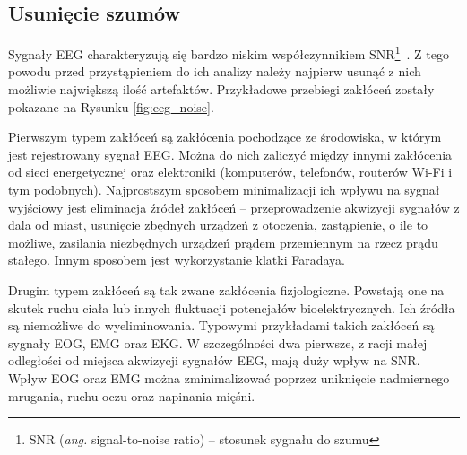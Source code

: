 \documentclass[skorowidz,skroty]{dyplomWEZUT}
\begin{document}
\subsection{Usunięcie szumów}
Sygnały EEG charakteryzują się bardzo niskim współczynnikiem SNR\footnote{SNR (\textit{ang.} signal-to-noise ratio) -- stosunek sygnału do szumu}~\cite{bci_trends}. Z tego powodu przed przystąpieniem do ich analizy należy najpierw usunąć z nich możliwie największą ilość artefaktów. Przykładowe przebiegi zakłóceń zostały pokazane na Rysunku \vref{fig:eeg_noise}.

Pierwszym typem zakłóceń są zakłócenia pochodzące ze środowiska, w którym jest rejestrowany sygnał EEG. Można do nich zaliczyć między innymi zakłócenia od sieci energetycznej oraz elektroniki (komputerów, telefonów, routerów Wi-Fi i tym podobnych). Najprostszym sposobem minimalizacji ich wpływu na sygnał wyjściowy jest eliminacja źródeł zakłóceń -- przeprowadzenie akwizycji sygnałów z dala od miast, usunięcie zbędnych urządzeń z otoczenia, zastąpienie, o ile to możliwe, zasilania niezbędnych urządzeń prądem przemiennym na rzecz prądu stałego. Innym sposobem jest wykorzystanie klatki Faradaya.

Drugim typem zakłóceń są tak zwane zakłócenia fizjologiczne. Powstają one na skutek ruchu ciała lub innych fluktuacji potencjałów bioelektrycznych. Ich źródła są niemożliwe do wyeliminowania. Typowymi przykładami takich zakłóceń są sygnały EOG, EMG oraz EKG. W szczególności dwa pierwsze, z racji małej odległości od miejsca akwizycji sygnałów EEG, mają duży wpływ na SNR. Wpływ EOG oraz EMG można zminimalizować poprzez uniknięcie nadmiernego mrugania, ruchu oczu oraz napinania mięśni.
\end{document}
